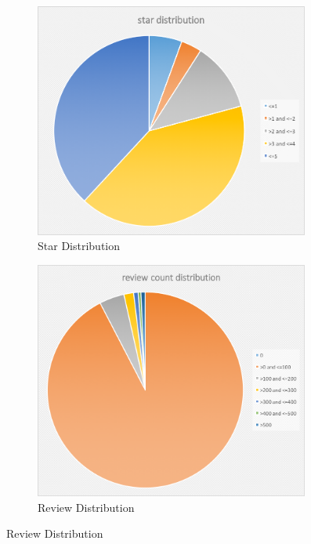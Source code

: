 \documentclass[11pt, oneside]{article}   	%
\begin{document}
\begin{figure}[t]
  \centering
  \begin{subfigure} [b]{0.45\textwidth}        
  	  \includegraphics[width=0.99\textwidth]{figures/stars.png}
        \caption{Star Distribution}
        \label{fig:star}
  \end{subfigure}
  \begin{subfigure}[b]{0.45\textwidth}        
        \includegraphics[width=0.99\textwidth]{figures/review.png}
        \caption{Review Distribution}

\end{subfigure}
\end{figure}
\end{document}
